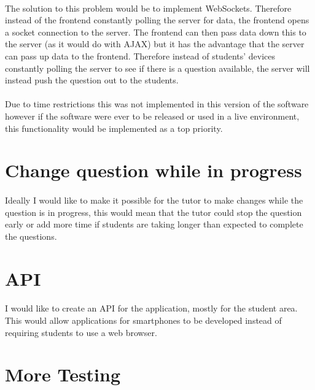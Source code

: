 \documentclass[10pt]{report}
\begin{document}
    \paragraph{}
    The solution to this problem would be to implement WebSockets.  Therefore instead of the frontend
    constantly polling the server for data, the frontend opens a socket connection to the server.  The
    frontend can then pass data down this to the server (as it would do with AJAX) but it has the
    advantage that the server can pass up data to the frontend.  Therefore instead of students' devices 
    constantly polling the server to see if there is a question available, the server will instead push
    the question out to the students.
    
    \paragraph{}
    Due to time restrictions this was not implemented in this version of the software however if the
    software were ever to be released or used in a live environment, this functionality would be
    implemented as a top priority.
    
    \section*{Change question while in progress}
    \paragraph{}
    Ideally I would like to make it possible for the tutor to make changes while the question is in
    progress, this would mean that the tutor could stop the question early or add more time if students
    are taking longer than expected to complete the questions.
    
    \section*{API}
    \paragraph{}
    I would like to create an API for the application, mostly for the student area.  This would allow
    applications for smartphones to be developed instead of requiring students to use a web browser.
    
    \section*{More Testing}
\end{document}
